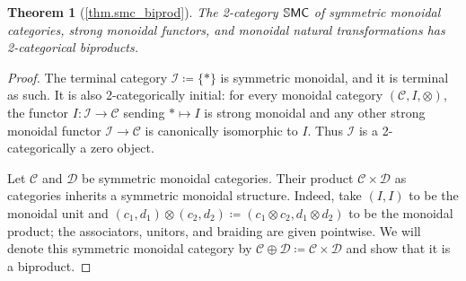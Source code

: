 \documentclass[11pt, oneside, article]{memoir}
\theoremstyle{plain}
\newtheorem*{theorem*}{Theorem}
\theoremstyle{definition}
\theoremstyle{remark}
\newcommand{\cat}[1]{\mathcal{#1}}%
\newcommand{\Cat}[1]{{\mathsf{#1}}}%
\newcommand{\CCat}[1]{\mathbb{\StrLeft{#1}{1}}\Cat{\StrGobbleLeft{#1}{1}}}%
\newcommand{\ssmc}{\CCat{SMC}}
\newcommand{\zero}{\cat{I}}
\begin{document}
\begin{theorem*}[\ref{thm.smc_biprod}]\label{page.smc_biprod}
The 2-category $\ssmc$ of symmetric monoidal categories, strong monoidal functors, and monoidal natural transformations has 2-categorical biproducts.
\end{theorem*}
\begin{proof}
The terminal category $\zero\coloneqq\{*\}$ is symmetric monoidal, and it is terminal as such. It is also 2-categorically initial: for every monoidal category $(\cat{C},I,\otimes)$, the functor $I\colon\zero\to\cat{C}$ sending $*\mapsto I$ is strong monoidal and any other strong monoidal functor $\zero\to\cat{C}$ is canonically isomorphic to $I$. Thus $\cat{I}$ is a 2-categorically a zero object.

Let $\cat{C}$ and $\cat{D}$ be symmetric monoidal categories. Their product $\cat{C}\times\cat{D}$ as categories inherits a symmetric monoidal structure. Indeed, take $(I,I)$ to be the monoidal unit and $(c_1,d_1)\otimes(c_2,d_2)\coloneqq(c_1\otimes c_2,d_1\otimes d_2)$ to be the monoidal product; the associators, unitors, and braiding are given pointwise. We will denote this symmetric monoidal category by $\cat{C}\oplus\cat{D}\coloneqq\cat{C}\times\cat{D}$ and show that it is a biproduct.


\end{proof}
\end{document}
